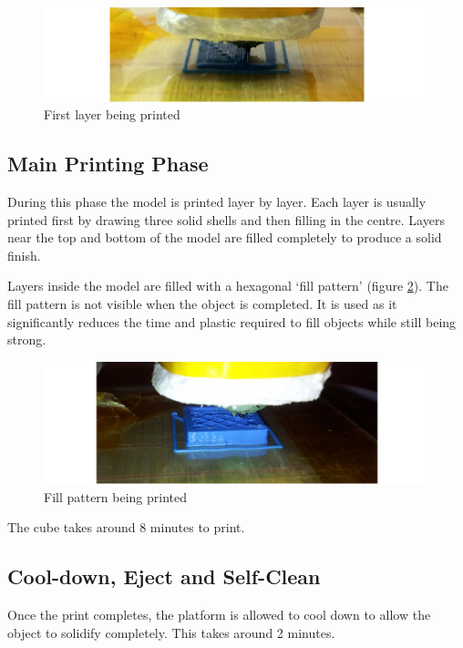 			\begin{figure}
				\includegraphics[width=1\textwidth]{diagrams/firstLayer.pdf}
				\caption{First layer being printed}
				\label{fig:firstLayer}
			\end{figure}
			
		\subsection{Main Printing Phase}
			
			During this phase the model is printed layer by layer. Each layer is
			usually printed first by drawing three solid shells and then filling in
			the centre. Layers near the top and bottom of the model are filled
			completely to produce a solid finish.
			
			Layers inside the model are filled with a hexagonal `fill pattern' (figure
			\ref{fig:fillPattern}). The fill pattern is not visible when the object is
			completed. It is used as it significantly reduces the time and plastic
			required to fill objects while still being strong.
			
			\begin{figure}
				\includegraphics[width=1\textwidth]{diagrams/fillPattern.pdf}
				\caption{Fill pattern being printed}
				\label{fig:fillPattern}
			\end{figure}
			
			The cube takes around 8 minutes to print.
		
		\subsection{Cool-down, Eject and Self-Clean}
			
			Once the print completes, the platform is allowed to cool down to allow
			the object to solidify completely. This takes around 2 minutes.
			
